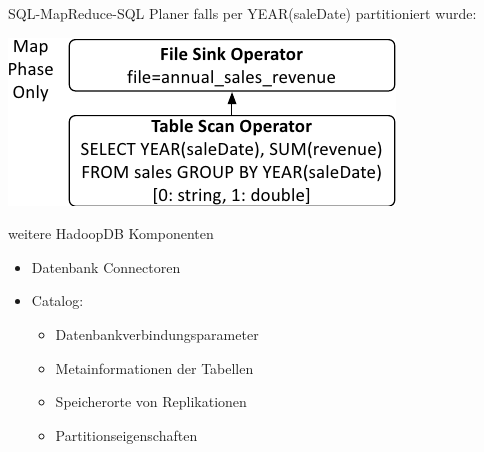 \documentclass{beamer}
\begin{document}
\begin{frame}{SQL-MapReduce-SQL Planer}
falls per YEAR(saleDate) partitioniert wurde:
  \begin{center}
    \includegraphics[height=0.3\textheight]{../ausarbeitung/images/hadoopdb-reduce-map-phase_b.png}    
  \end{center}
\end{frame}

\begin{frame}{weitere HadoopDB Komponenten}
  \begin{itemize}
  \item Datenbank Connectoren
  \item Catalog:
    \begin{itemize}
    \item Datenbankverbindungsparameter
    \item Metainformationen der Tabellen
    \item Speicherorte von Replikationen
    \item Partitionseigenschaften
    \end{itemize}
  \end{itemize}
\end{frame}
\end{document}
